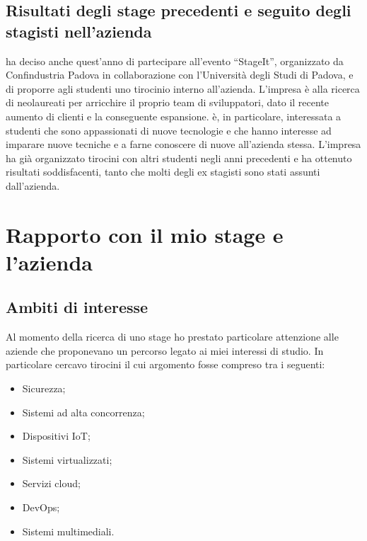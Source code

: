    \subsection{Risultati degli stage precedenti e seguito degli stagisti nell'azienda}
   \nomeAzienda{} ha deciso anche quest'anno di partecipare all'evento ``StageIt'', organizzato da Confindustria Padova in collaborazione con l'Università degli Studi di Padova, e di proporre agli studenti uno tirocinio interno all'azienda. L'impresa è alla ricerca di neolaureati per arricchire il proprio team di sviluppatori, dato il recente aumento di clienti e la conseguente espansione. 
   \nomeAzienda{} è, in particolare, interessata a studenti che sono appassionati di nuove tecnologie e che hanno interesse ad imparare nuove tecniche e a farne conoscere di nuove all'azienda stessa.
   L'impresa ha già organizzato tirocini con altri studenti negli anni precedenti e ha ottenuto risultati soddisfacenti, tanto che molti degli ex stagisti sono stati assunti dall'azienda.

\section{Rapporto con il mio stage e l'azienda}
   \subsection{Ambiti di interesse}
   Al momento della ricerca di uno stage ho prestato particolare attenzione alle aziende che proponevano un percorso legato ai miei interessi di studio. In particolare cercavo tirocini il cui argomento fosse compreso tra i seguenti:
   \begin{itemize}
      \item{Sicurezza;}
      \item{Sistemi ad alta concorrenza;}
      \item{Dispositivi IoT;}
      \item{Sistemi virtualizzati;}
      \item{Servizi cloud;}
      \item{DevOps;}
      \item{Sistemi multimediali.}
   \end{itemize}

